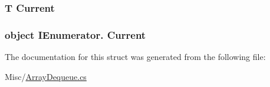 \subsubsection[{Current}]{\setlength{\rightskip}{0pt plus 5cm}T Current\hspace{0.3cm}{\ttfamily [get]}}\label{structOTA_1_1Misc_1_1ArrayDeque_1_1DequeEnumerator_abda1e5f310119fca15f32296086b0d8c}
\hypertarget{structOTA_1_1Misc_1_1ArrayDeque_1_1DequeEnumerator_a8eccab58e57bd9ad7d0acb94bdd3c754}{}
\subsubsection[{Current}]{\setlength{\rightskip}{0pt plus 5cm}object I\+Enumerator. Current\hspace{0.3cm}{\ttfamily [get]}}\label{structOTA_1_1Misc_1_1ArrayDeque_1_1DequeEnumerator_a8eccab58e57bd9ad7d0acb94bdd3c754}


The documentation for this struct was generated from the following file\+:\begin{DoxyCompactItemize}
\item 
Misc/\hyperlink{ArrayDequeue_8cs}{Array\+Dequeue.\+cs}\end{DoxyCompactItemize}
